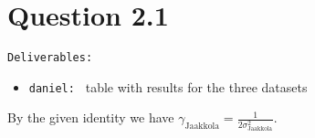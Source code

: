 \section*{Question 2.1}

\texttt{Deliverables: } 
\begin{itemize}
	\item \texttt{daniel: } table with results for the three datasets 
\end{itemize}

By the given identity we have
$\gamma_{\text{Jaakkola}}=\frac{1}{2\sigma_{\text{Jaakkola}}^2}$.
